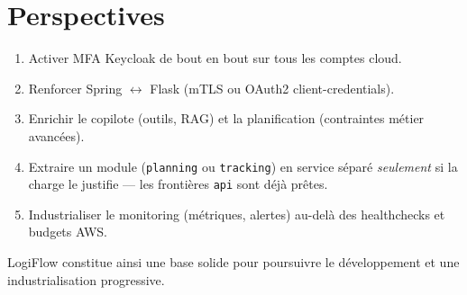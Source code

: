 \section{Perspectives}

\begin{enumerate}[leftmargin=*]
  \item Activer MFA Keycloak de bout en bout sur tous les comptes cloud.
  \item Renforcer Spring $\leftrightarrow$ Flask (mTLS ou OAuth2 client-credentials).
  \item Enrichir le copilote (outils, RAG) et la planification (contraintes métier avancées).
  \item Extraire un module (\texttt{planning} ou \texttt{tracking}) en service séparé
        \emph{seulement} si la charge le justifie --- les frontières \texttt{api} sont déjà prêtes.
  \item Industrialiser le monitoring (métriques, alertes) au-delà des healthchecks et budgets AWS.
\end{enumerate}

LogiFlow constitue ainsi une base solide pour poursuivre le développement et une
industrialisation progressive.
